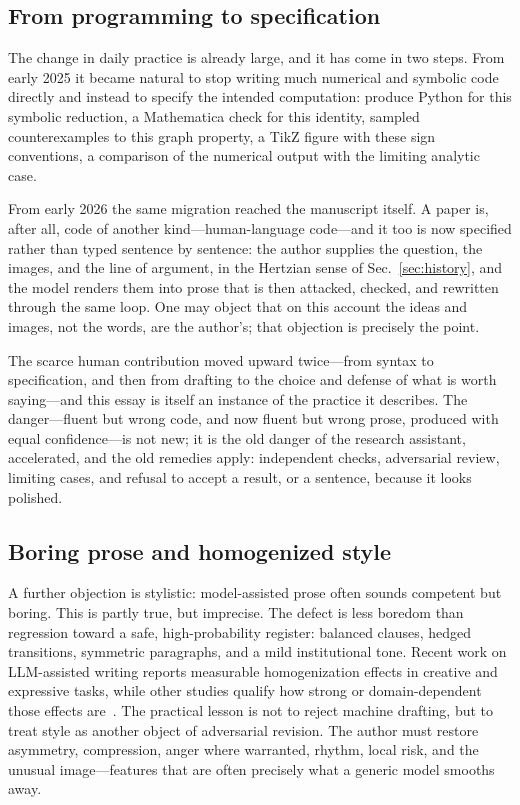 \documentclass[
  aps,
  reprint,
  superscriptaddress,
  floatfix,
  nofootinbib,
  longbibliography
]{revtex4-2}
\begin{document}
\subsection{From programming to specification}

The change in daily practice is already large, and it has come in two steps.
From early 2025 it became natural to stop writing much numerical and symbolic
code directly and instead to specify the intended computation: produce Python
for this symbolic reduction, a Mathematica check for this identity, sampled
counterexamples to this graph property, a TikZ figure with these sign
conventions, a comparison of the numerical output with the limiting analytic
case.

From early 2026 the same migration reached the manuscript itself. A paper
is, after all, code of another kind---human-language code---and it too is now
specified rather than typed sentence by sentence: the author supplies the
question, the images, and the line of argument, in the Hertzian sense of
Sec.~\ref{sec:history}, and the model renders them into prose that is then
attacked, checked, and rewritten through the same loop. One may object that on
this account the ideas and images, not the words, are the author's; that
objection is precisely the point.

 The scarce human contribution moved upward
twice---from syntax to specification, and then from drafting to the choice and
defense of what is worth saying---and this essay is itself an instance of the
practice it describes. The danger---fluent but wrong code, and now fluent but
wrong prose, produced with equal confidence---is not new; it is the old danger
of the research assistant, accelerated, and the old remedies apply: independent
checks, adversarial review, limiting cases, and refusal to accept a result, or a
sentence, because it looks polished.

\subsection{Boring prose and homogenized style}
\label{sec:boring-prose}

A further objection is stylistic: model-assisted prose often sounds competent but
boring. This is partly true, but imprecise. The defect is less boredom than
regression toward a safe, high-probability register: balanced clauses, hedged
transitions, symmetric paragraphs, and a mild institutional tone. Recent work on
LLM-assisted writing reports measurable homogenization effects in creative and
expressive tasks, while other studies qualify how strong or domain-dependent
those effects are~\cite{padmakumar2024homogenization,anderson2024homogenization,ghods2024against}. The practical lesson is not to reject machine drafting, but to
treat style as another object of adversarial revision. The author must restore
asymmetry, compression, anger where warranted, rhythm, local risk, and the
unusual image---features that are often precisely what a generic model smooths
away.
\end{document}
